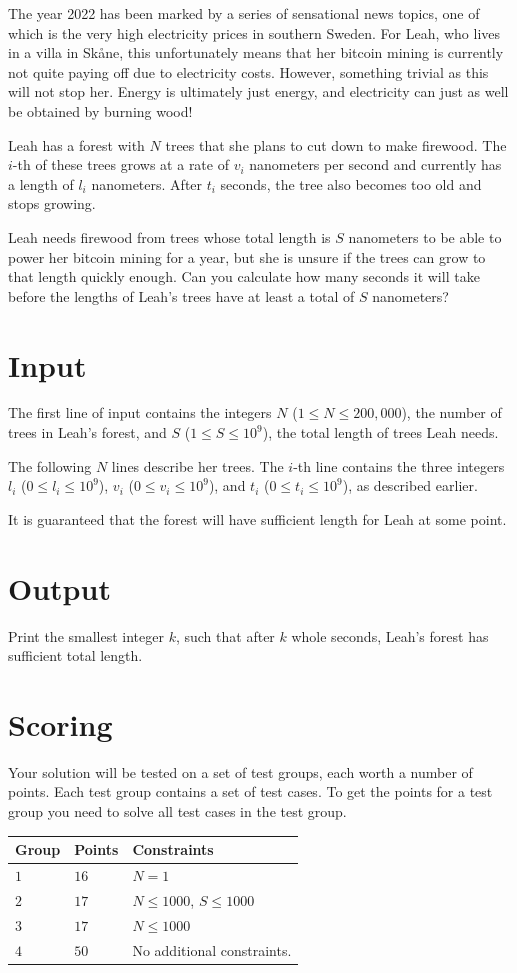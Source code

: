 
The year 2022 has been marked by a series of sensational news topics, one of which is the very
high electricity prices in southern Sweden. For Leah, who lives in a villa in Skåne, this unfortunately
means that her bitcoin mining is currently not quite paying off due to electricity costs. However,
something trivial as this will not stop her. Energy is ultimately just energy, and electricity can
just as well be obtained by burning wood!

Leah has a forest with $N$ trees that she plans to cut down to make firewood. The $i$-th of these trees
grows at a rate of $v_i$ nanometers per second and currently has a length of $l_i$ nanometers. After $t_i$ seconds,
the tree also becomes too old and stops growing.

Leah needs firewood from trees whose total length is $S$ nanometers to be able to power her bitcoin mining
for a year, but she is unsure if the trees can grow to that length quickly enough. Can you calculate
how many seconds it will take before the lengths of Leah's trees have at least a total of $S$ nanometers?


\section*{Input}
The first line of input contains the integers $N$ ($1 \leq N \leq 200,000$), the number of trees
in Leah's forest, and $S$ ($1 \leq S \leq 10^9$), the total length of trees Leah needs.

The following $N$ lines describe her trees.
The $i$-th line contains the three integers $l_i$ ($0 \leq l_i \leq 10^9$), $v_i$ ($0 \leq v_i \leq 10^9$),
and $t_i$ ($0 \leq t_i \leq 10^9$), as described earlier.

It is guaranteed that the forest will have sufficient length for Leah at some point.

\section*{Output}
Print the smallest integer $k$, such that after $k$ whole seconds, Leah's forest has sufficient total length.


\section*{Scoring}
Your solution will be tested on a set of test groups, each worth a number of points. Each test group contains
a set of test cases. To get the points for a test group you need to solve all test cases in the test group.

\noindent
\begin{tabular}{| l | l | p{12cm} |}
  \hline
  \textbf{Group} & \textbf{Points} & \textbf{Constraints} \\ \hline
  $1$    & $16$      & $N = 1$ \\ \hline
  $2$    & $17$      & $N \le 1000$, $S \le 1000$ \\ \hline
  $3$    & $17$      & $N \le 1000$ \\ \hline
  $4$    & $50$      & No additional constraints. \\ \hline
\end{tabular}
